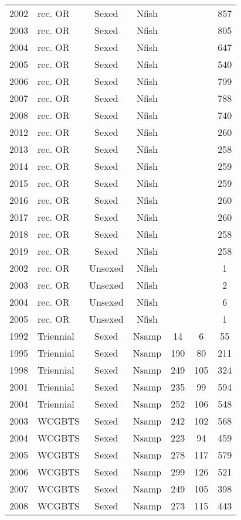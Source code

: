 \begin{longtable}[t]{c>{\centering\arraybackslash}p{3cm}ccccc}
2002 & rec. OR & Sexed & Nfish &  &  & 857\\
2003 & rec. OR & Sexed & Nfish &  &  & 805\\
2004 & rec. OR & Sexed & Nfish &  &  & 647\\
2005 & rec. OR & Sexed & Nfish &  &  & 540\\
2006 & rec. OR & Sexed & Nfish &  &  & 799\\
2007 & rec. OR & Sexed & Nfish &  &  & 788\\
2008 & rec. OR & Sexed & Nfish &  &  & 740\\
2012 & rec. OR & Sexed & Nfish &  &  & 260\\
2013 & rec. OR & Sexed & Nfish &  &  & 258\\
2014 & rec. OR & Sexed & Nfish &  &  & 259\\
2015 & rec. OR & Sexed & Nfish &  &  & 259\\
2016 & rec. OR & Sexed & Nfish &  &  & 260\\
2017 & rec. OR & Sexed & Nfish &  &  & 260\\
2018 & rec. OR & Sexed & Nfish &  &  & 258\\
2019 & rec. OR & Sexed & Nfish &  &  & 258\\
2002 & rec. OR & Unsexed & Nfish &  &  & 1\\
2003 & rec. OR & Unsexed & Nfish &  &  & 2\\
2004 & rec. OR & Unsexed & Nfish &  &  & 6\\
2005 & rec. OR & Unsexed & Nfish &  &  & 1\\
1992 & Triennial & Sexed & Nsamp & 14 & 6 & 55\\
1995 & Triennial & Sexed & Nsamp & 190 & 80 & 211\\
1998 & Triennial & Sexed & Nsamp & 249 & 105 & 324\\
2001 & Triennial & Sexed & Nsamp & 235 & 99 & 594\\
2004 & Triennial & Sexed & Nsamp & 252 & 106 & 548\\
2003 & WCGBTS & Sexed & Nsamp & 242 & 102 & 568\\
2004 & WCGBTS & Sexed & Nsamp & 223 & 94 & 459\\
2005 & WCGBTS & Sexed & Nsamp & 278 & 117 & 579\\
2006 & WCGBTS & Sexed & Nsamp & 299 & 126 & 521\\
2007 & WCGBTS & Sexed & Nsamp & 249 & 105 & 398\\
2008 & WCGBTS & Sexed & Nsamp & 273 & 115 & 443\\

\end{longtable}
